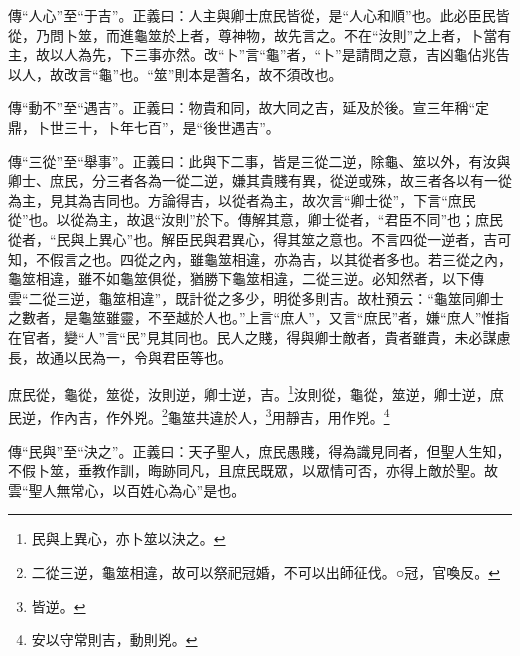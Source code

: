 {\noindent\zhuan{}\fzbyks 傳“人心”至“于吉”。正義曰：人主與卿士庶民皆從，是“人心和順”也。此必臣民皆從，乃問卜筮，而進龜筮於上者，尊神物，故先言之。不在“汝則”之上者，卜當有主，故以人為先，下三事亦然。改“卜”言“龜”者，“卜”是請問之意，吉凶龜佔兆告以人，故改言“龜”也。“筮”則本是蓍名，故不須改也。 \par}

{\noindent\zhuan{}\fzbyks 傳“動不”至“遇吉”。正義曰：物貴和同，故大同之吉，延及於後。宣三年稱“定鼎，卜世三十，卜年七百”，是“後世遇吉”。 \par}

{\noindent\zhuan{}\fzbyks 傳“三從”至“舉事”。正義曰：此與下二事，皆是三從二逆，除龜、筮以外，有汝與卿士、庶民，分三者各為一從二逆，嫌其貴賤有異，從逆或殊，故三者各以有一從為主，見其為吉同也。方論得吉，以從者為主，故次言“卿士從”，下言“庶民從”也。以從為主，故退“汝則”於下。傳解其意，卿士從者，“君臣不同”也；庶民從者，“民與上異心”也。解臣民與君異心，得其筮之意也。不言四從一逆者，吉可知，不假言之也。四從之內，雖龜筮相違，亦為吉，以其從者多也。若三從之內，龜筮相違，雖不如龜筮俱從，猶勝下龜筮相違，二從三逆。必知然者，以下傳雲“二從三逆，龜筮相違”，既計從之多少，明從多則吉。故杜預云：“龜筮同卿士之數者，是龜筮雖靈，不至越於人也。”上言“庶人”，又言“庶民”者，嫌“庶人”惟指在官者，變“人”言“民”見其同也。民人之賤，得與卿士敵者，貴者雖貴，未必謀慮長，故通以民為一，令與君臣等也。 \par}

庶民從，龜從，筮從，汝則逆，卿士逆，吉。\footnote{民與上異心，亦卜筮以決之。}汝則從，龜從，筮逆，卿士逆，庶民逆，作內吉，作外兇。\footnote{二從三逆，龜筮相違，故可以祭祀冠婚，不可以出師征伐。○冠，官喚反。}龜筮共違於人，\footnote{皆逆。}用靜吉，用作兇。\footnote{安以守常則吉，動則兇。}

{\noindent\zhuan{}\fzbyks 傳“民與”至“決之”。正義曰：天子聖人，庶民愚賤，得為識見同者，但聖人生知，不假卜筮，垂教作訓，晦跡同凡，且庶民既眾，以眾情可否，亦得上敵於聖。故雲“聖人無常心，以百姓心為心”是也。 \par}

